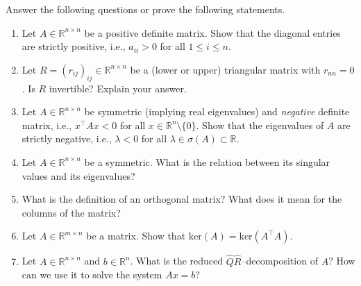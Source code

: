 Answer the following questions or prove the following statements.
\begin{enumerate}
	\item Let $A \in \mathbb{R}^{n \times n}$ be a positive definite matrix. Show that the diagonal entries are strictly positive, i.e.,  $a_{ii} > 0$ for all $1\leq i\leq n$.
	\item Let $R=(r_{ij})_{ij} \in \mathbb{R}^{n \times n}$ be a (lower or upper) triangular matrix with $r_{nn} = 0$. Is $R$ invertible? Explain your answer.	
	\item Let $A \in \mathbb{R}^{n \times n}$ be symmetric (implying real eigenvalues) and \textit{negative} definite matrix, i.e., $x^\top A x < 0$ for all $x \in \mathbb{R}^{n}\setminus \{0\}$. Show that the eigenvalues of $A$ are strictly negative, i.e., $\lambda < 0 $ for all $\lambda \in \sigma(A) \subset \mathbb{R}$.		
	\item Let $A \in \mathbb{R}^{n \times n}$ be a symmetric. What is the relation between its singular values and its eigenvalues?
	\item What is the definition of an orthogonal matrix? What does it mean for the columns of the matrix?
	\item Let $A \in \mathbb{R}^{m \times n}$ be a matrix. Show that $\text{ker}(A)=\text{ker}(A^\top A)$.
	\item Let $A\in\mathbb{R}^{n \times n}$ and $b \in \mathbb{R}^n$. What is the reduced $\widehat{Q}\widehat{R}$--decomposition of $A$? How can we use it to solve the system $Ax = b$?
\end{enumerate}